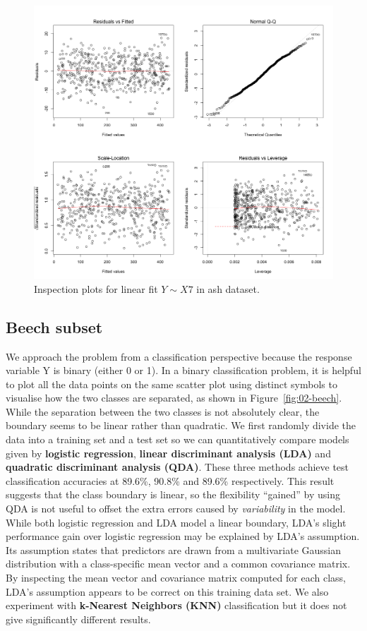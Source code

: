 \documentclass{article}
\begin{document}
\begin{figure}[h!]
  \includegraphics[width=\linewidth]{project/images/01-ash.png}
  \caption{Inspection plots for linear fit $Y \sim X7$ in ash dataset.}
  \label{fig:01-ash}
\end{figure}

\subsection{Beech subset}

We approach the problem from a classification perspective because the response variable Y is binary (either 0 or 1). In a binary classification problem, it is helpful to plot all the data points on the same scatter plot using distinct symbols to visualise how the two classes are separated, as shown in Figure~\ref{fig:02-beech}. While the separation between the two classes is not absolutely clear, the boundary seems to be linear rather than quadratic. We first randomly divide the data into a training set and a test set so we can quantitatively compare models given by  \textbf{logistic regression},  \textbf{linear discriminant analysis (LDA)} and  \textbf{quadratic discriminant analysis (QDA)}. These three methods achieve test classification accuracies at 89.6\%, 90.8\% and 89.6\% respectively. This result suggests that the class boundary is linear, so the flexibility ``gained'' by using QDA is not useful to offset the extra errors caused by {\em variability} in the model. While both logistic regression and LDA model a linear boundary, LDA's slight performance gain over logistic regression may be explained by LDA's assumption. Its assumption states that predictors are drawn from a multivariate Gaussian distribution with a class-specific mean vector and a common covariance matrix. By inspecting the mean vector and covariance matrix computed for each class, LDA's assumption appears to be correct on this training data set. We also experiment with \textbf{k-Nearest Neighbors (KNN)} classification but it does not give significantly different results.
\end{document}
